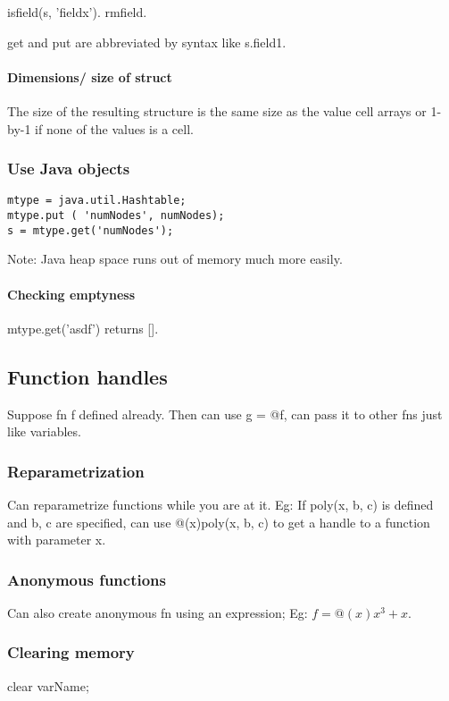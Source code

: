 isfield(s, 'fieldx'). rmfield.

get and put are abbreviated by syntax like s.field1.

\paragraph*{Dimensions/ size of struct}
The size of the resulting structure is the same size as the value cell arrays or 1-by-1 if none of the values is a cell.

\subsubsection{Use Java objects}
\begin{verbatim}
mtype = java.util.Hashtable;
mtype.put ( 'numNodes', numNodes);
s = mtype.get('numNodes');
\end{verbatim}

Note: Java heap space runs out of memory much more easily.

\paragraph*{Checking emptyness}
mtype.get('asdf') returns [].

\subsection{Function handles}
Suppose fn f defined already. Then can use g = @f, can pass it to other fns just like variables.

\subsubsection{Reparametrization}
Can reparametrize functions while you are at it. Eg: If poly(x, b, c) is defined and b, c are specified, can use @(x)poly(x, b, c) to get a handle to a function with parameter x.

\subsubsection{Anonymous functions}
Can also create anonymous fn using an expression; Eg: $f = @(x)x^3+x$.

\subsubsection{Clearing memory}
clear varName;

